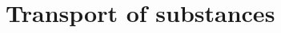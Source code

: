 \def\abs#1{\lvert#1\rvert}
\def\argdot{{\hspace{0.18em}\cdot\hspace{0.18em}}}
\def\avg#1{\left\{#1\right\}_\omega}
\def\D{{\tn D}}
\def\div{\operatorname{div}}
\def\Eh{\mathcal E_h}       %
\def\Ehcom{\mathcal E_{h,C}}         %
\def\Ehdir{\mathcal E_{h,D}}         %
\def\Ehint{\mathcal E_{h,I}}       %
\def\grad{\nabla}
\def\jmp#1{[#1]}
\def\n{\vc n}
\def\vc#1{\mathbf{\boldsymbol{#1}}}     %
\def\R{\mathbb R}
\def\sc#1#2{\left(#1,#2\right)}
\def\Th{\mathcal T_h}       %
\def\th{\vartheta}
\def\tn#1{{\mathbb{#1}}}    %
\def\Tr{\operatorname{Tr}}
\def\where{\,|\,}


\section{Transport of substances}

